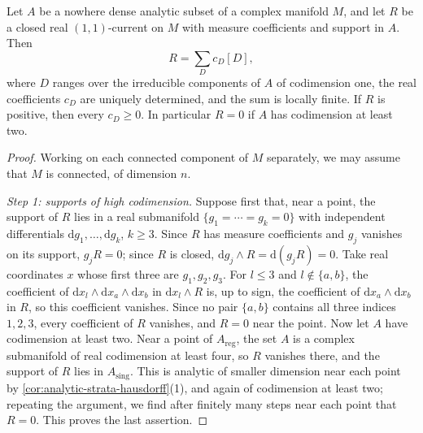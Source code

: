 \begin{theorem}\label{thm:analytic-order-zero-support}
Let $A$ be a nowhere dense analytic subset of a complex manifold $M$, and let $R$ be a closed real $(1,1)$-current on $M$ with measure coefficients and support in $A$. Then
\[
 R=\sum_D c_D[D],
\]
where $D$ ranges over the irreducible components of $A$ of codimension one, the real coefficients $c_D$ are uniquely determined, and the sum is locally finite. If $R$ is positive, then every $c_D\geq0$. In particular $R=0$ if $A$ has codimension at least two.
\end{theorem}
\begin{proof}
Working on each connected component of $M$ separately, we may assume that $M$ is connected, of dimension $n$.

\emph{Step 1: supports of high codimension.} Suppose first that, near a point, the support of $R$ lies in a real submanifold $\{g_1=\cdots=g_k=0\}$ with independent differentials $\mathrm dg_1,\ldots,\mathrm dg_k$, $k\geq3$. Since $R$ has measure coefficients and $g_j$ vanishes on its support, $g_jR=0$; since $R$ is closed, $\mathrm dg_j\wedge R=\mathrm d(g_jR)=0$. Take real coordinates $x$ whose first three are $g_1,g_2,g_3$. For $l\leq3$ and $l\notin\{a,b\}$, the coefficient of $\mathrm dx_l\wedge\mathrm dx_a\wedge\mathrm dx_b$ in $\mathrm dx_l\wedge R$ is, up to sign, the coefficient of $\mathrm dx_a\wedge\mathrm dx_b$ in $R$, so this coefficient vanishes. Since no pair $\{a,b\}$ contains all three indices $1,2,3$, every coefficient of $R$ vanishes, and $R=0$ near the point. Now let $A$ have codimension at least two. Near a point of $A_{\mathrm{reg}}$, the set $A$ is a complex submanifold of real codimension at least four, so $R$ vanishes there, and the support of $R$ lies in $A_{\mathrm{sing}}$. This is analytic of smaller dimension near each point by \cref{cor:analytic-strata-hausdorff}(1), and again of codimension at least two; repeating the argument, we find after finitely many steps near each point that $R=0$. This proves the last assertion.


\end{proof}
